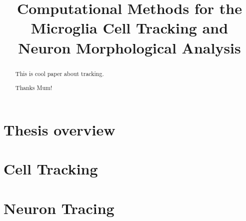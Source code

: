 \documentclass[b5,12pt]{report}
\title{Computational Methods for the Microglia Cell Tracking and Neuron Morphological Analysis}
\begin{document}
\maketitle
\begin{abstract}
 This is cool paper about tracking.
\end{abstract}
\renewcommand{\abstractname}{Acknowledgements}
\begin{abstract}
 Thanks Mum!
\end{abstract}

\tableofcontents
\listoffigures
\part{Thesis overview}

\part{Cell Tracking}
\part{Neuron Tracing}




\end{document}

